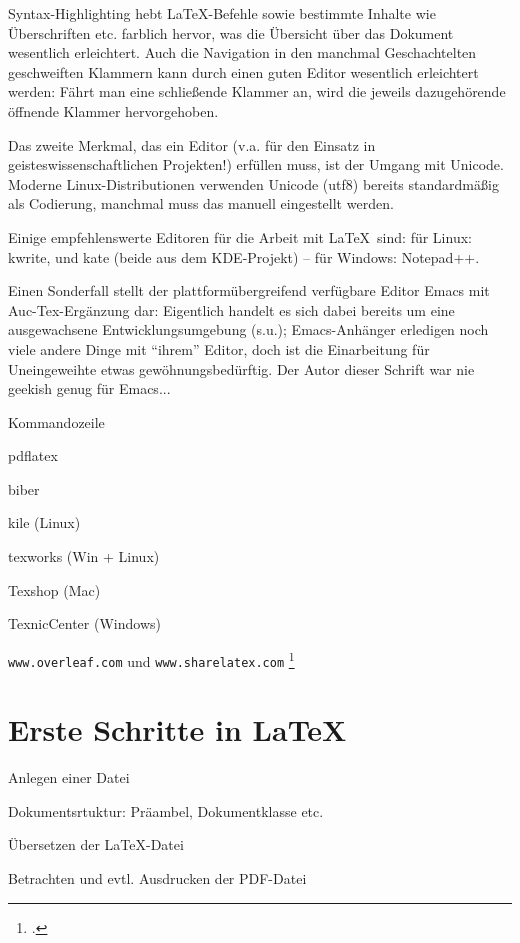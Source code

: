 \documentclass[draft=false,11pt,DIV=8]{scrbook}  	%
\begin{document}
Syntax-Highlighting hebt \LaTeX -Befehle sowie bestimmte Inhalte wie Überschriften etc. farblich
hervor, was die Übersicht über das Dokument wesentlich erleichtert. Auch die Navigation in
den manchmal Geschachtelten geschweiften Klammern kann durch einen guten Editor wesentlich
erleichtert werden: Fährt man eine schließende Klammer an, wird die jeweils dazugehörende
öffnende Klammer hervorgehoben.

Das zweite Merkmal, das ein Editor (v.a. für den Einsatz in geisteswissenschaftlichen Projekten!) 
erfüllen muss, ist der Umgang mit Unicode. Moderne Linux-Distributionen verwenden Unicode (utf8)
bereits standardmäßig als Codierung, manchmal muss das manuell eingestellt werden.

Einige empfehlenswerte Editoren für die Arbeit mit \LaTeX\ sind:
für Linux: kwrite,  und kate (beide aus dem KDE-Projekt) --
für Windows: Notepad++.

Einen Sonderfall stellt der plattformübergreifend verfügbare Editor Emacs mit Auc-Tex-Ergänzung
dar: Eigentlich handelt es sich dabei bereits um eine ausgewachsene Entwicklungsumgebung (s.u.);
Emacs-Anhänger erledigen noch viele andere Dinge mit \enquote{ihrem} Editor, doch ist die 
Einarbeitung für Uneingeweihte etwas gewöhnungsbedürftig.
Der Autor dieser Schrift war nie geekish genug für Emacs...

Kommandozeile

pdflatex

biber



kile (Linux)

texworks (Win + Linux)

Texshop (Mac)

TexnicCenter (Windows)


\texttt{www.overleaf.com}  und \texttt{www.sharelatex.com} 
\footcite{meyer:dtk2015/1}



\section{Erste Schritte in \LaTeX}

Anlegen einer Datei

Dokumentsrtuktur: Präambel, Dokumentklasse etc.

Übersetzen der \LaTeX{}-Datei

Betrachten und evtl. Ausdrucken der PDF-Datei
\end{document}
